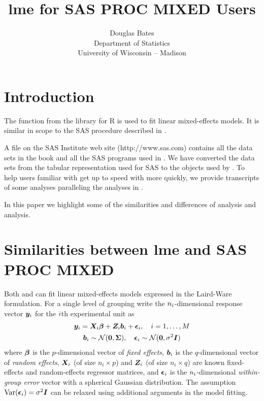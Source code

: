 \documentclass[12pt]{article}
\begin{document}
\title{\textbf{\textsf{lme} for \textsf{SAS PROC MIXED} Users}}
\author{Douglas Bates\\Department of Statistics\\University of
  Wisconsin -- Madison\\}
\date{}
\maketitle
\section{Introduction}
\label{sec:intro}

The  function from the  library for \textsf{R} is used
to fit linear mixed-effects models.  It is similar in scope to the
\textsf{SAS} procedure  described in
\citet{litt:mill:stro:wolf:1996}.

A file on the SAS Institute web site (\textsf{http://www.sas.com})
contains all the data sets in the book and all the SAS programs used
in \citet{litt:mill:stro:wolf:1996}.  We have converted the data
sets from the tabular representation used for SAS to the
 objects used by .  To help users familiar
with  get up to speed with  more quickly,
we provide transcripts of some  analyses paralleling the
 analyses in \citet{litt:mill:stro:wolf:1996}.

In this paper we highlight some of the similarities and differences of
 analysis and  analysis.

\section{Similarities between lme and SAS PROC MIXED}
\label{sec:similarities}

Both  and  can fit linear mixed-effects
models expressed in the Laird-Ware formulation.  For a single level of
grouping \citet{lair:ware:1982} write the $n_i\/$-dimensional
response vector $\bm{y}_i$ for the $i\/$th experimental unit as
\begin{gather}
  \label{eqn:oneLevel}
  \bm{y}_i = \bm{X}_i \bm{\beta} + \bm{Z}_i \bm{b}_i + \bm{\epsilon}_i,\quad i=1,\dots,M\\
  \bm{b}_i\sim\mathcal{N}(\bm{0},\bm{\Sigma}),
  \quad\bm{\epsilon}_i\sim\mathcal{N}(\bm{0},\sigma^2 \bm{I})\notag
\end{gather}
where $\bm{\beta}$ is the $p$-dimensional vector of \emph{fixed effects},
$\bm{b}_i$ is the $q$-dimensional vector of \emph{random effects},
$\bm{X}_i$ (of size $n_i\times p$) and $\bm{Z}_i$ (of size $n_i\times q$)
are known fixed-effects and random-effects regressor matrices, and
$\bm{\epsilon}_i$ is the $n_i\/$-dimensional \emph{within-group error} vector
with a spherical Gaussian distribution.  The assumption
$\mathrm{Var}(\bm{\epsilon}_i)=\sigma^2\bm{I}$ can be relaxed using additional
arguments in the model fitting.
\end{document}
